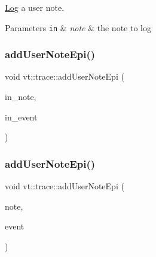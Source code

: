 \hyperlink{structvt_1_1trace_1_1_log}{Log} a user note. 


\begin{DoxyParams}[1]{Parameters}
\mbox{\tt in}  & {\em note} & the note to log \\
\hline
\end{DoxyParams}
\mbox{\label{namespacevt_1_1trace_adf857bfe26769050d0a5d484bfac2c37}} 
\subsubsection{\texorpdfstring{add\+User\+Note\+Epi()}{addUserNoteEpi()}\hspace{0.1cm}{\footnotesize\ttfamily [1/2]}}
{\footnotesize\ttfamily void vt\+::trace\+::add\+User\+Note\+Epi (\begin{DoxyParamCaption}\item[{\mbox{[}\mbox{[}maybe\+\_\+unused\mbox{]} \mbox{]} std\+::string const \&}]{in\+\_\+note,  }\item[{\mbox{[}\mbox{[}maybe\+\_\+unused\mbox{]} \mbox{]} \hyperlink{namespacevt_1_1trace_a64a7185f3e102df8d8258f263ccd1582}{Trace\+Event\+I\+D\+Type} const}]{in\+\_\+event }\end{DoxyParamCaption})}

\mbox{\label{namespacevt_1_1trace_a44c28c2bd54ed805974c79c8aea5a55e}} 
\subsubsection{\texorpdfstring{add\+User\+Note\+Epi()}{addUserNoteEpi()}\hspace{0.1cm}{\footnotesize\ttfamily [2/2]}}
{\footnotesize\ttfamily void vt\+::trace\+::add\+User\+Note\+Epi (\begin{DoxyParamCaption}\item[{std\+::string const \&}]{note,  }\item[{\hyperlink{namespacevt_1_1trace_a64a7185f3e102df8d8258f263ccd1582}{Trace\+Event\+I\+D\+Type} const}]{event }\end{DoxyParamCaption})}



